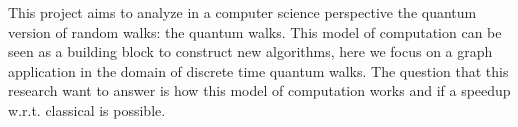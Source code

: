 
This project aims to analyze in a computer science perspective the quantum version of random walks: the quantum walks. This model of computation can be seen as a 
building block to construct new algorithms, here we focus on a graph application in the domain of discrete time quantum walks. The question that this research 
want to answer is how this model of computation works and if a speedup w.r.t. classical is possible. 


